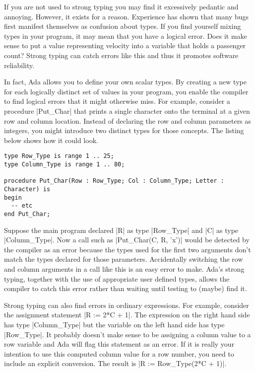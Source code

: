 If you are not used to strong typing you may find it excessively pedantic and annoying. However,
it exists for a reason. Experience has shown that many bugs first manifest themselves as
confusion about types. If you find yourself mixing types in your program, it may mean that you
have a logical error. Does it make sense to put a value representing velocity into a variable
that holds a passenger count? Strong typing can catch errors like this and thus it promotes
software reliability.

In fact, Ada allows you to define your own scalar types. By creating a new type for each
logically distinct set of values in your program, you enable the compiler to find logical errors
that it might otherwise miss. For example, consider a procedure |Put_Char| that prints a single
character onto the terminal at a given row and column location. Instead of declaring the row and
column parameters as integers, you might introduce two distinct types for those concepts. The
listing below shows how it could look.

\begin{lstlisting}
type Row_Type is range 1 .. 25;
type Column_Type is range 1 .. 80;

procedure Put_Char(Row : Row_Type; Col : Column_Type; Letter : Character) is
begin
  -- etc
end Put_Char;
\end{lstlisting}

Suppose the main program declared |R| as type |Row_Type| and |C| as type |Column_Type|. Now a
call such as |Put_Char(C, R, 'x')| would be detected by the compiler as an error because the
types used for the first two arguments don't match the types declared for those parameters.
Accidentally switching the row and column arguments in a call like this is an easy error to
make. Ada's strong typing, together with the use of appropriate user defined types, allows the
compiler to catch this error rather than waiting until testing to (maybe) find it.

Strong typing can also find errors in ordinary expressions. For example, consider the assignment
statement |R := 2*C + 1|. The expression on the right hand side has type |Column_Type| but the
variable on the left hand side has type |Row_Type|. It probably doesn't make sense to be
assigning a column value to a row variable and Ada will flag this statement as an error. If it
is really your intention to use this computed column value for a row number, you need to include
an explicit conversion. The result is |R := Row_Type(2*C + 1)|.

